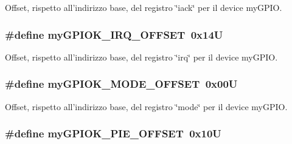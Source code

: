 Offset, rispetto all'indirizzo base, del registro \char`\"{}iack\char`\"{} per il device my\+G\+P\+I\+O. 

\hypertarget{group___linux-_driver_ga37ee502d1ba364dfde9261c4f7a537a6}{
\subsubsection[{my\+G\+P\+I\+O\+K\+\_\+\+I\+R\+Q\+\_\+\+O\+F\+F\+S\+E\+T}]{\setlength{\rightskip}{0pt plus 5cm}\#define my\+G\+P\+I\+O\+K\+\_\+\+I\+R\+Q\+\_\+\+O\+F\+F\+S\+E\+T~0x14\+U}}\label{group___linux-_driver_ga37ee502d1ba364dfde9261c4f7a537a6}


Offset, rispetto all'indirizzo base, del registro \char`\"{}irq\char`\"{} per il device my\+G\+P\+I\+O. 

\hypertarget{group___linux-_driver_ga543e17293942b7cf7936a5e095ddc7ef}{
\subsubsection[{my\+G\+P\+I\+O\+K\+\_\+\+M\+O\+D\+E\+\_\+\+O\+F\+F\+S\+E\+T}]{\setlength{\rightskip}{0pt plus 5cm}\#define my\+G\+P\+I\+O\+K\+\_\+\+M\+O\+D\+E\+\_\+\+O\+F\+F\+S\+E\+T~0x00\+U}}\label{group___linux-_driver_ga543e17293942b7cf7936a5e095ddc7ef}


Offset, rispetto all'indirizzo base, del registro \char`\"{}mode\char`\"{} per il device my\+G\+P\+I\+O. 

\hypertarget{group___linux-_driver_ga2ed7646e6f910f5803477e51b7fe26e3}{
\subsubsection[{my\+G\+P\+I\+O\+K\+\_\+\+P\+I\+E\+\_\+\+O\+F\+F\+S\+E\+T}]{\setlength{\rightskip}{0pt plus 5cm}\#define my\+G\+P\+I\+O\+K\+\_\+\+P\+I\+E\+\_\+\+O\+F\+F\+S\+E\+T~0x10\+U}}\label{group___linux-_driver_ga2ed7646e6f910f5803477e51b7fe26e3}


